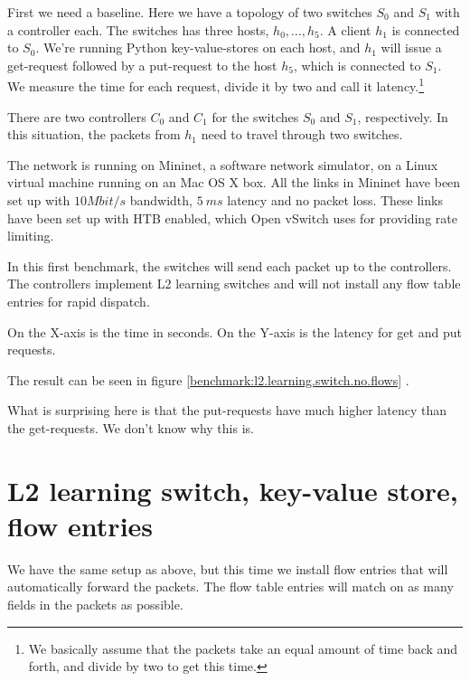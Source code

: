 First we need a baseline.  Here we have a topology
of two switches $S_0$ and $S_1$ with a controller each.  The switches has
three hosts, $h_0, \dots, h_5$.  A client $h_1$ is connected to $S_0$. We're
running Python key-value-stores on each host, and $h_1$ will issue a
get-request followed by a put-request to the host $h_5$, which is connected
to $S_1$.  We measure the time for each request, divide it by two and call
it latency.\footnote{We basically assume that the packets take an equal
  amount of time back and forth, and divide by two to get this time.}

There are two controllers $C_0$ and $C_1$ for the switches $S_0$ and $S_1$,
respectively.  In this situation, the packets from $h_1$ need to travel
through two switches.

The network is running on Mininet, a software network simulator, on a Linux
virtual machine running on an Mac OS X box.  All the links in Mininet have
been set up with $10 Mbit/s$ bandwidth, $5~ms$
latency  and no packet
loss.  These links have been set up with \ac{HTB} \cite{devera2002hierarchical} enabled, which Open vSwitch uses for providing rate limiting.

In this first benchmark, the switches will send each packet up to the
controllers.  The controllers implement L2 learning switches
and will not install any flow table entries for rapid dispatch.

On the X-axis is the time in seconds.  On the Y-axis is the
latency for get and put requests.

The result can be seen in figure \ref{benchmark:l2.learning.switch.no.flows} 
.

What is surprising here is that the put-requests have much higher latency
than the get-requests. We don't know why this is.

\section{L2 learning switch, key-value store, flow entries}

We have the same setup as above, but this time we install flow entries that
will automatically forward the packets.  The flow table entries will match
on as many fields in the packets as possible.

